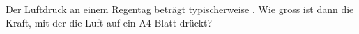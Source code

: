 Der Luftdruck an einem Regentag beträgt typischerweise \preO. Wie gross ist dann die Kraft, mit der die Luft auf ein A4-Blatt drückt?

